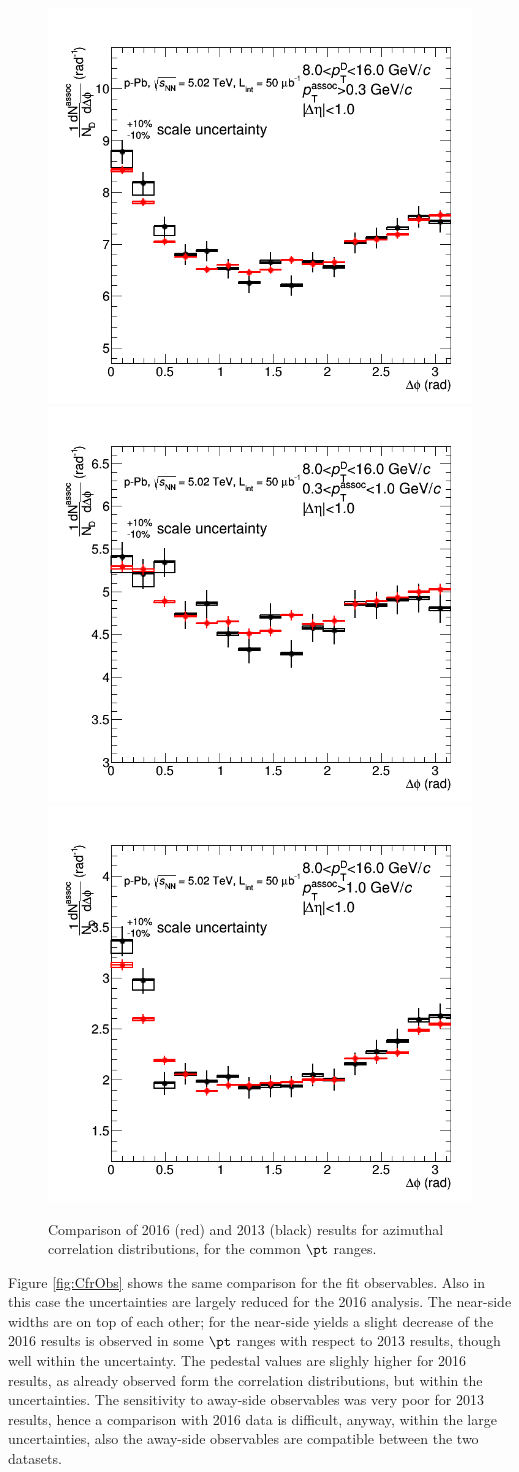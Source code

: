 \begin{figure}[!htbp]
{\includegraphics[width=0.47\linewidth]{figures/Cfr2013vs2016/Average_Cfr_2013_2016_Pt8to16_Thr03to99.png}}
{\includegraphics[width=0.47\linewidth]{figures/Cfr2013vs2016/Average_Cfr_2013_2016_Pt8to16_Thr03to1.png}}
{\includegraphics[width=0.47\linewidth]{figures/Cfr2013vs2016/Average_Cfr_2013_2016_Pt8to16_Thr1to99.png}}
\caption{Comparison of 2016 (red) and 2013 (black) results for azimuthal correlation distributions, for the common $\pt$ ranges.}
\label{fig:CfrAverage}
\end{figure}

Figure \ref{fig:CfrObs} shows the same comparison for the fit observables. Also in this case the uncertainties are largely reduced for the 2016 analysis. The near-side widths are on top of each other; for the near-side yields a slight decrease of the 2016 results is observed in some $\pt$ ranges with respect to 2013 results, though well within the uncertainty. The pedestal values are slighly higher for 2016 results, as already observed form the correlation distributions, but within the uncertainties. The sensitivity to away-side observables was very poor for 2013 results, hence a comparison with 2016 data is difficult, anyway, within the large uncertainties, also the away-side observables are compatible between the two datasets.

